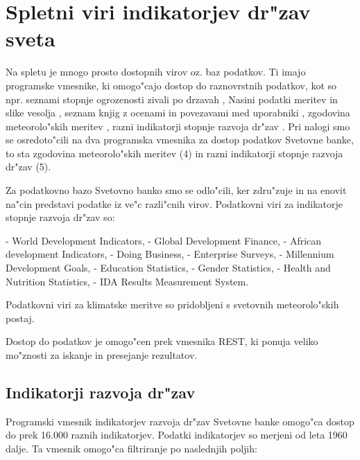 \chapter{Spletni viri indikatorjev dr"zav sveta}

Na spletu je mnogo prosto dostopnih virov oz. baz podatkov. Ti imajo programske
vmesnike, ki omogo"cajo dostop do raznovrstnih podatkov, kot so npr. seznami 
stopnje ogrozenosti zivali po drzavah 
,
Nasini podatki meritev in slike vesolja
,
seznam knjig z ocenami in povezavami med uporabniki
,
zgodovina meteorolo"skih meritev
,
razni indikatorji stopnje razvoja dr"zav
.
Pri nalogi smo se osredoto"cili na dva programska vmesnika za dostop podatkov 
Svetovne banke, to sta zgodovina meteorolo"skih meritev (4) in razni 
indikatorji stopnje razvoja dr"zav (5).


% 
% 
% 
% 


Za podatkovno bazo Svetovno banko smo se odlo"cili, ker zdru"zuje in na enovit
na"cin predstavi podatke iz ve"c razli"cnih virov. Podatkovni viri za indikatorje
stopnje razvoja dr"zav so:

- World Development Indicators, 
- Global Development Finance, 
- African development Indicators, 
- Doing Business,
- Enterprise Surveys, 
- Millennium Development Goals, 
- Education Statistics, 
- Gender Statistics,
- Health and Nutrition Statistics, 
- IDA Results Measurement System.

Podatkovni viri za klimatske meritve so pridobljeni s svetovnih meteorolo"skih 
postaj.


Dostop do podatkov je omogo"cen prek vmesnika REST, ki ponuja veliko mo"znosti 
za iskanje in presejanje rezultatov.





\section{Indikatorji razvoja dr"zav}

Programski vmesnik indikatorjev razvoja dr"zav Svetovne banke omogo"ca dostop
do prek 16.000 raznih indikatorjev. Podatki indikatorjev so merjeni od leta
1960 dalje. Ta vmesnik omogo"ca filtriranje po naslednjih poljih:


